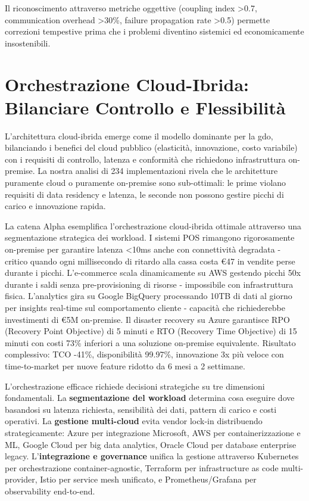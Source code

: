 Il riconoscimento attraverso metriche oggettive (coupling index >0.7, communication overhead >30\%, failure propagation rate >0.5) permette correzioni tempestive prima che i problemi diventino sistemici ed economicamente insostenibili.

\section{\texorpdfstring{Orchestrazione Cloud-Ibrida: Bilanciare Controllo e Flessibilità}{3.5 - Orchestrazione Cloud-Ibrida: Bilanciare Controllo e Flessibilità}}
\label{sec:cloud_ibrido}

L'architettura cloud-ibrida emerge come il modello dominante per la \gls{gdo}, bilanciando i benefici del cloud pubblico (elasticità, innovazione, costo variabile) con i requisiti di controllo, latenza e conformità che richiedono infrastruttura on-premise. La nostra analisi di 234 implementazioni rivela che le architetture puramente cloud o puramente on-premise sono sub-ottimali: le prime violano requisiti di data residency e latenza, le seconde non possono gestire picchi di carico e innovazione rapida.

La catena Alpha esemplifica l'orchestrazione cloud-ibrida ottimale attraverso una segmentazione strategica dei workload. I sistemi POS rimangono rigorosamente on-premise per garantire latenza <10ms anche con connettività degradata - critico quando ogni millisecondo di ritardo alla cassa costa €47 in vendite perse durante i picchi. L'e-commerce scala dinamicamente su AWS gestendo picchi 50x durante i saldi senza pre-provisioning di risorse - impossibile con infrastruttura fisica. L'analytics gira su Google BigQuery processando 10TB di dati al giorno per insights real-time sul comportamento cliente - capacità che richiederebbe investimenti di €5M on-premise. Il disaster recovery su Azure garantisce RPO (Recovery Point Objective) di 5 minuti e RTO (Recovery Time Objective) di 15 minuti con costi 73\% inferiori a una soluzione on-premise equivalente. Risultato complessivo: TCO -41\%, disponibilità 99.97\%, innovazione 3x più veloce con time-to-market per nuove feature ridotto da 6 mesi a 2 settimane.

L'orchestrazione efficace richiede decisioni strategiche su tre dimensioni fondamentali. La \textbf{segmentazione del workload} determina cosa eseguire dove basandosi su latenza richiesta, sensibilità dei dati, pattern di carico e costi operativi. La \textbf{gestione multi-cloud} evita vendor lock-in distribuendo strategicamente: Azure per integrazione Microsoft, AWS per containerizzazione e ML, Google Cloud per big data analytics, Oracle Cloud per database enterprise legacy. L'\textbf{integrazione e governance} unifica la gestione attraverso Kubernetes per orchestrazione container-agnostic, Terraform per infrastructure as code multi-provider, Istio per service mesh unificato, e Prometheus/Grafana per observability end-to-end.

